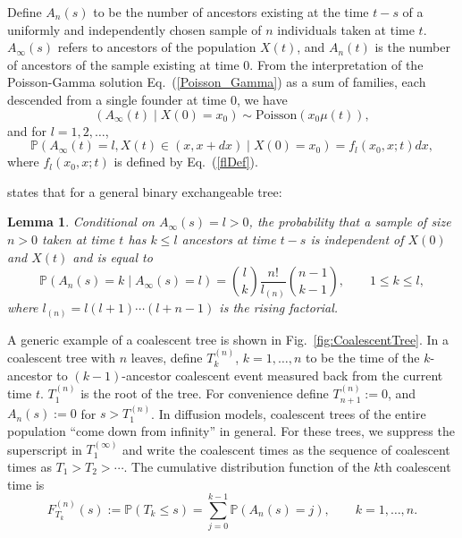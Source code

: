 \documentclass[preprint,12pt]{elsarticle}
\newtheorem{lemma}{Lemma}
\begin{document}
Define $A_n(s)$ to be the number of ancestors existing at the time $t - s$ of a uniformly and independently chosen sample of $n$ individuals taken at time $t$.  
$A_\infty(s)$ refers to ancestors of the population $X(t)$, and $A_n(t)$ is the number of ancestors of the 
sample existing at time 0.  From the interpretation of the Poisson-Gamma solution Eq.~(\ref{Poisson_Gamma}) as a sum of families, each 
descended from a single founder at time 0, we have 
\begin{equation*}	%
(A_\infty(t) \mid X(0) = x_0) \sim \text{Poisson}(x_0 \mu(t)), 
\end{equation*}
and for $l = 1, 2, \ldots$, 
\[
\mathbb{P}(A_\infty(t)  = l, X(t) \in(x, x + dx) \mid X(0) = x_0) = f_l(x_0, x; t) dx, 
\] 
where $f_l(x_0, x; t)$ is defined by Eq.~(\ref{flDef}).

\citet[Lemma~1]{BurdenGriffiths24} states that for a 
general binary exchangeable tree: 
\begin{lemma} \label{lemma:probAnGivenAinf}
Conditional on $A_\infty(s) = l > 0$, the probability that a sample of size $n > 0$ taken at time $t$ has $k \le l$ 
ancestors at time $t - s$ is independent of $X(0)$ and $X(t)$ and is equal to 
\begin{equation}	\label{probAnGivenAinf}
\mathbb{P}(A_n(s) = k \mid A_\infty(s) = l) = \binom{l}{k} \frac{n!}{l_{(n)}} \binom{n - 1}{k - 1}, \qquad 1 \le k \le l, 
\end{equation}
where $l_{(n)} = l(l + 1)\cdots(l + n - 1)$ is the rising factorial.  
\end{lemma}

A generic example of a coalescent tree is shown in Fig.~\ref{fig:CoalescentTree}.  
In a coalescent tree with $n$ leaves, define $T_k^{(n)}$, $k = 1, \ldots, n$ to be the time of the $k$-ancestor to $(k - 1)$-ancestor coalescent event measured back
from the current time $t$.  $T_1^{(n)}$ is the root of the tree.  
For convenience define $T_{n + 1}^{(n)} := 0$, and $A_n(s) := 0$ for $s > T_1^{(n)}$.  In diffusion models, coalescent trees of the entire 
population ``come down from infinity'' in general.  For these trees, we suppress the superscript in $T_1^{(\infty)}$ and write the coalescent times as the sequence 
of coalescent times as $T_1 >  T_2 >  \cdots$.  The cumulative distribution function of the $k$th coalescent time is 
\begin{equation}	\label{TkFromAn}
F_{T_k}^{(n)}(s) := \mathbb{P}(T_k \le s) = \sum_{j = 0}^{k - 1} \mathbb{P}(A_n(s) = j), \qquad k = 1, \ldots, n.
\end{equation}
\end{document}
